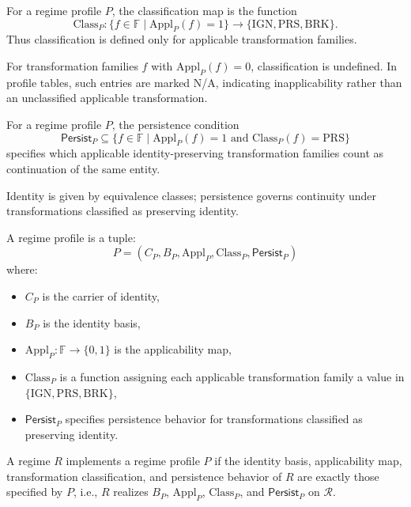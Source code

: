 \begin{definition}
  \label{def:transformation_classification}
  For a regime profile $P$, the classification map is the function
  \[
    \mathrm{Class}_P :
    \{ f \in \mathbb{F} \mid \mathrm{Appl}_P(f)=1 \}
    \to
    \{ \mathrm{IGN}, \mathrm{PRS}, \mathrm{BRK} \}.
  \]
  Thus classification is defined only for applicable transformation families.
\end{definition}

For transformation families $f$ with $\mathrm{Appl}_P(f) = 0$,
classification is undefined.
In profile tables, such entries are marked N/A,
indicating inapplicability rather than an
unclassified applicable transformation.

\begin{definition}
  \label{def:persistence_condition}
  For a regime profile $P$, the persistence condition
  \[
    \mathsf{Persist}_P \subseteq
    \{ f \in \mathbb{F} \mid \mathrm{Appl}_P(f)=1 \text{ and } \mathrm{Class}_P(f)=\mathrm{PRS} \}
  \]
  specifies which applicable identity-preserving transformation families
  count as continuation of the same entity.
\end{definition}


  Identity is given by equivalence classes;
  persistence governs continuity under
  transformations classified as preserving identity.


\begin{definition}
  \label{def:regime_profile}
  A regime profile is a tuple:
  \[
    P = (C_P, B_P, \mathrm{Appl}_P, \mathrm{Class}_P, \mathsf{Persist}_P)
  \]
  where:
  \begin{itemize}
    \item $C_P$ is the carrier of identity,
    \item $B_P$ is the identity basis,
    \item $\mathrm{Appl}_P : \mathbb{F} \to \{0,1\}$ is the applicability map,
    \item $\mathrm{Class}_P$ is a function assigning each applicable transformation family
          a value in $\{ \mathrm{IGN}, \mathrm{PRS}, \mathrm{BRK} \}$,
    \item $\mathsf{Persist}_P$ specifies persistence behavior for transformations
          classified as preserving identity.
  \end{itemize}
\end{definition}

\begin{definition}[Regime]
  \label{def:regime}
  A regime $R$ implements a regime profile $P$ if the
  identity basis, applicability map, transformation classification,
  and persistence behavior of $R$ are exactly those specified by $P$,
  i.e., $R$ realizes $B_P$, $\mathrm{Appl}_P$,
  $\mathrm{Class}_P$, and $\mathsf{Persist}_P$ on $\mathcal{R}$.
\end{definition}



